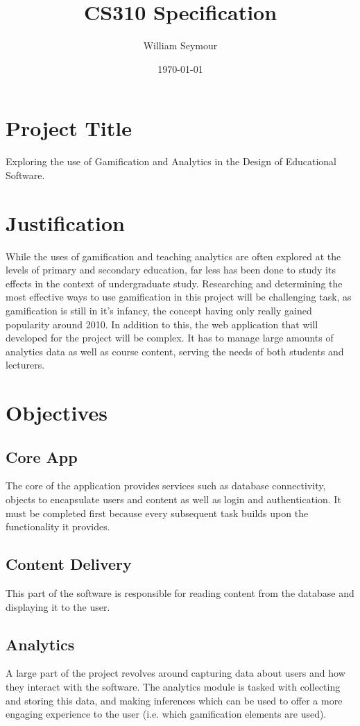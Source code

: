 \documentclass{report}
\begin{document}
\title{CS310 Specification}
\author{William Seymour}
\date{\today}
\maketitle

\section*{Project Title}
Exploring the use of Gamification and Analytics in the Design of Educational Software.
\section*{Justification}
While the uses of gamification and teaching analytics are often explored at the levels of primary and secondary education, far less has been done to study its effects in the context of undergraduate study. Researching and determining the most effective ways to use gamification in this project will be challenging task, as gamification is still in it's infancy, the concept having only really gained popularity around 2010. In addition to this, the web application that will developed for the project will be complex. It has to manage large amounts of analytics data as well as course content, serving the needs of both students and lecturers.
\section*{Objectives}
\subsection*{Core App}
The core of the application provides services such as database connectivity, objects to encapsulate users and content as well as login and authentication. It must be completed first because every subsequent task builds upon the functionality it provides.
\subsection*{Content Delivery}
This part of the software is responsible for reading content from the database and displaying it to the user.
\subsection*{Analytics}
A large part of the project revolves around capturing data about users and how they interact with the software. The analytics module is tasked with collecting and storing this data, and making inferences which can be used to offer a more engaging experience to the user (i.e. which gamification elements are used).
\end{document}
